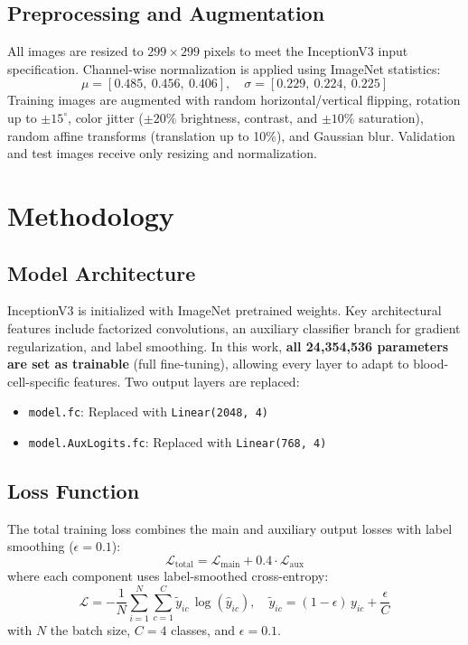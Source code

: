 \documentclass[conference]{IEEEtran}
\begin{document}
\subsection{Preprocessing and Augmentation}
All images are resized to $299 \times 299$ pixels to meet the InceptionV3 input specification. Channel-wise normalization is applied using ImageNet statistics:
\[
  \mu = [0.485,\ 0.456,\ 0.406], \quad \sigma = [0.229,\ 0.224,\ 0.225]
\]
Training images are augmented with random horizontal/vertical flipping, rotation up to $\pm 15^\circ$, color jitter ($\pm 20\%$ brightness, contrast, and $\pm 10\%$ saturation), random affine transforms (translation up to 10\%), and Gaussian blur. Validation and test images receive only resizing and normalization.

\section{Methodology}

\subsection{Model Architecture}

InceptionV3 \cite{szegedy2016} is initialized with ImageNet pretrained weights. Key architectural features include factorized convolutions, an auxiliary classifier branch for gradient regularization, and label smoothing. In this work, \textbf{all 24,354,536 parameters are set as trainable} (full fine-tuning), allowing every layer to adapt to blood-cell-specific features. Two output layers are replaced:
\begin{itemize}
  \item \texttt{model.fc}: Replaced with \texttt{Linear(2048, 4)}
  \item \texttt{model.AuxLogits.fc}: Replaced with \texttt{Linear(768, 4)}
\end{itemize}

\subsection{Loss Function}

The total training loss combines the main and auxiliary output losses with label smoothing ($\epsilon = 0.1$):
\begin{equation}
  \mathcal{L}_{\text{total}} = \mathcal{L}_{\text{main}} + 0.4 \cdot \mathcal{L}_{\text{aux}}
\end{equation}
where each component uses label-smoothed cross-entropy:
\begin{equation}
  \mathcal{L} = -\frac{1}{N}\sum_{i=1}^{N}\sum_{c=1}^{C}
  \tilde{y}_{ic}\,\log\!\left(\hat{y}_{ic}\right), \quad
  \tilde{y}_{ic} = (1{-}\epsilon)\,y_{ic} + \frac{\epsilon}{C}
\end{equation}
with $N$ the batch size, $C = 4$ classes, and $\epsilon = 0.1$.
\end{document}
